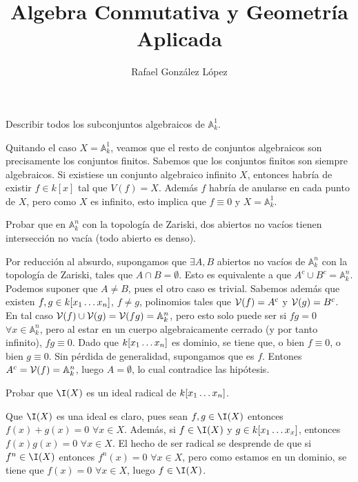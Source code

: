 \documentclass[twoside]{article}
\begin{document}
\title{Algebra Conmutativa y Geometría Aplicada}
\author{Rafael González López}
\maketitle

\begin{ejercicio}{1}
Describir todos los subconjuntos algebraicos de $\mathbb{A}_k^1$.
\begin{solucion}
Quitando el caso $X=\mathbb{A}_k^1$, veamos que el resto de conjuntos algebraicos son precisamente los conjuntos finitos. Sabemos que los conjuntos finitos son siempre algebraicos. Si existiese un conjunto algebraico infinito $X$, entonces habría de existir $f \in k[x]$ tal que $V(f)=X$. Además $f$ habría de anularse en cada punto de $X$, pero como $X$ es infinito, esto implica que $f\equiv 0$ y $X=\mathbb{A}_k^1$.
\end{solucion}
\end{ejercicio}

\newpage 
\begin{ejercicio}{2}
Probar que en $\mathbb{A}^n_k$ con la topología de Zariski, dos abiertos no vacíos tienen intersección no vacía (todo abierto es denso).
\begin{solucion}
Por reducción al absurdo, supongamos que $\exists A,B$ abiertos no vacíos de $\mathbb{A}_k^n$ con la topología de Zariski, tales que $A\cap B =\emptyset$. Esto es equivalente a que $A^c \cup B^c = \mathbb{A}_k^n$. Podemos suponer que $A\neq B$, pues el otro caso es trivial. Sabemos además que existen $f,g\in k[x_1\dotsc x_{n}]$, $f\neq g$, polinomios tales que $\mathcal{V}(f) = A^c$ y $\mathcal{V}(g)=B^c$. En tal caso $\mathcal{V}(f)\cup \mathcal{V}(g)=\mathcal{V}(fg) = \mathbb{A}^n_k$, pero esto solo puede ser si $fg = 0$ $\forall x\in \mathbb{A}^n_k$, pero al estar en un cuerpo algebraicamente cerrado (y por tanto infinito), $fg\equiv 0$. Dado que $k[x_1\dotsc x_{n}]$ es dominio, se tiene que, o bien $f\equiv 0$, o bien $g \equiv 0$. Sin pérdida de generalidad, supongamos que es $f$. Entones $A^c = \mathcal{V}(f) = \mathbb{A}_k^n$, luego $A=\emptyset$, lo cual contradice las hipótesis.
\end{solucion}
\end{ejercicio}

\newpage 
\begin{ejercicio}{3}
Probar que $\I(X)$ es un ideal radical de $k[x_1\dotsc x_{n}]$.
\begin{solucion}
Que $\I(X)$ es una ideal es claro, pues sean $f,g \in \I(X)$ entonces $f(x)+g(x)=0$ $\forall x\in X$. Además, si $f\in \I(X)$ y $g \in k[x_1\dotsc x_{x}]$, entonces $f(x)g(x)=0$ $\forall x\in X$. El hecho de ser radical se desprende de que si $f^n\in \I(X)$ entonces $f^n(x) =0$ $\forall x \in X$, pero como estamos en un dominio, se tiene que $f(x)=0$ $\forall x\in X$, luego $f\in \I(X)$.
\end{solucion}
\end{ejercicio}	
\end{document}
